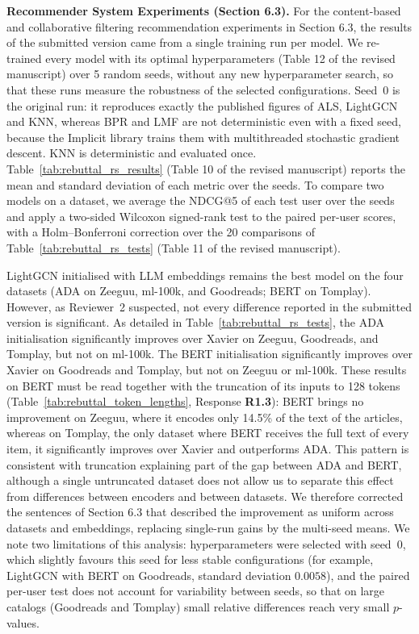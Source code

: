\documentclass[11pt,a4paper]{article}
\newenvironment{mmblock}{}{}
\begin{document}
\begin{mmblock}
\noindent\textbf{Recommender System Experiments (Section 6.3).} For the content-based and collaborative filtering recommendation experiments in Section 6.3, the results of the submitted version came from a single training run per model. We re-trained every model with its optimal hyperparameters (Table 12 of the revised manuscript) over 5 random seeds, without any new hyperparameter search, so that these runs measure the robustness of the selected configurations. Seed~0 is the original run: it reproduces exactly the published figures of ALS, LightGCN and KNN, whereas BPR and LMF are not deterministic even with a fixed seed, because the Implicit library trains them with multithreaded stochastic gradient descent. KNN is deterministic and evaluated once. Table~\ref{tab:rebuttal_rs_results} (Table 10 of the revised manuscript) reports the mean and standard deviation of each metric over the seeds. To compare two models on a dataset, we average the NDCG@5 of each test user over the seeds and apply a two-sided Wilcoxon signed-rank test to the paired per-user scores, with a Holm--Bonferroni correction over the 20 comparisons of Table~\ref{tab:rebuttal_rs_tests} (Table 11 of the revised manuscript).

LightGCN initialised with LLM embeddings remains the best model on the four datasets (ADA on Zeeguu, ml-100k, and Goodreads; BERT on Tomplay). However, as Reviewer~2 suspected, not every difference reported in the submitted version is significant. As detailed in Table~\ref{tab:rebuttal_rs_tests}, the ADA initialisation significantly improves over Xavier on Zeeguu, Goodreads, and Tomplay, but not on ml-100k. The BERT initialisation significantly improves over Xavier on Goodreads and Tomplay, but not on Zeeguu or ml-100k. These results on BERT must be read together with the truncation of its inputs to 128 tokens (Table~\ref{tab:rebuttal_token_lengths}, Response \textbf{R1.3}): BERT brings no improvement on Zeeguu, where it encodes only 14.5\% of the text of the articles, whereas on Tomplay, the only dataset where BERT receives the full text of every item, it significantly improves over Xavier and outperforms ADA. This pattern is consistent with truncation explaining part of the gap between ADA and BERT, although a single untruncated dataset does not allow us to separate this effect from differences between encoders and between datasets. %
We therefore corrected the sentences of Section 6.3 that described the improvement as uniform across datasets and embeddings, replacing single-run gains by the multi-seed means. We note two limitations of this analysis: hyperparameters were selected with seed~0, which slightly favours this seed for less stable configurations (for example, LightGCN with BERT on Goodreads, standard deviation $0.0058$), and the paired per-user test does not account for variability between seeds, so that on large catalogs (Goodreads and Tomplay) small relative differences reach very small $p$-values.
\end{mmblock}
\end{document}
